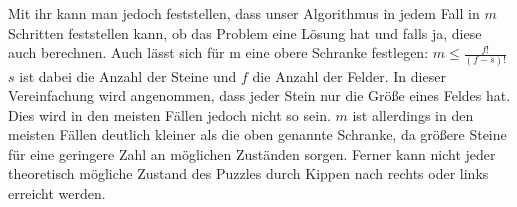 	Mit ihr kann man jedoch feststellen, dass unser Algorithmus in jedem Fall in \(m\) Schritten feststellen kann, ob das Problem eine Lösung hat und falls ja, diese auch berechnen. 
	Auch lässt sich für m eine obere Schranke festlegen: \(m \le \frac{f!}{(f-s)!}\) \(s\) ist dabei die Anzahl der Steine und \(f\) die Anzahl der Felder. 
	In dieser Vereinfachung wird angenommen, dass jeder Stein nur die Größe eines Feldes hat. Dies wird in den meisten Fällen jedoch nicht so sein.
	\(m\) ist allerdings in den meisten Fällen deutlich kleiner als die oben genannte Schranke, da größere Steine für eine geringere Zahl an möglichen Zuständen sorgen. Ferner kann nicht jeder theoretisch mögliche Zustand des Puzzles durch Kippen nach rechts oder links erreicht werden.

